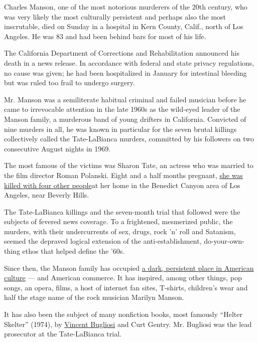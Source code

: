 Charles Manson, one of the most notorious murderers of the 20th century,
who was very likely the most culturally persistent and perhaps also the
most inscrutable, died on Sunday in a hospital in Kern County, Calif.,
north of Los Angeles. He was 83 and had been behind bars for most of his
life.

The California Department of Corrections and Rehabilitation announced
his death in a news release. In accordance with federal and state
privacy regulations, no cause was given; he had been hospitalized in
January for intestinal bleeding but was ruled too frail to undergo
surgery.

Mr. Manson was a semiliterate habitual criminal and failed musician
before he came to irrevocable attention in the late 1960s as the
wild-eyed leader of the Manson family, a murderous band of young
drifters in California. Convicted of nine murders in all, he was known
in particular for the seven brutal killings collectively called the
Tate-LaBianca murders, committed by his followers on two consecutive
August nights in 1969.

The most famous of the victims was Sharon Tate, an actress who was
married to the film director Roman Polanski. Eight and a half months
pregnant,
\href{http://www.nytimes3xbfgragh.onion/1970/08/22/archives/coroner-details-the-tate-killing-says-actress-was-stabbed-16-times.html}{she
was killed with four other people}at her home in the Benedict Canyon
area of Los Angeles, near Beverly Hills.

The Tate-LaBianca killings and the seven-month trial that followed were
the subjects of fevered news coverage. To a frightened, mesmerized
public, the murders, with their undercurrents of sex, drugs, rock 'n'
roll and Satanism, seemed the depraved logical extension of the
anti-establishment, do-your-own-thing ethos that helped define the '60s.

Since then, the Manson family has occupied
\href{https://www.nytimes3xbfgragh.onion/2017/11/20/arts/charles-manson-pop-culture.html}{a
dark, persistent place in American culture} --- and American commerce.
It has inspired, among other things, pop songs, an opera, films, a host
of internet fan sites, T-shirts, children's wear and half the stage name
of the rock musician Marilyn Manson.

It has also been the subject of many nonfiction books, most famously
``Helter Skelter'' (1974), by
\href{https://www.nytimes3xbfgragh.onion/2015/06/10/us/vincent-t-bugliosi-manson-prosecutor-and-true-crime-author-dies-at-80.html}{Vincent
Bugliosi} and Curt Gentry. Mr. Bugliosi was the lead prosecutor at the
Tate-LaBianca trial.


